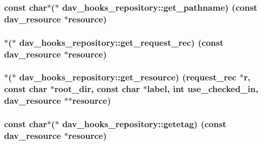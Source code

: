\subsubsection[{\texorpdfstring{get\+\_\+pathname}{get_pathname}}]{\setlength{\rightskip}{0pt plus 5cm}const char$\ast$($\ast$ dav\+\_\+hooks\+\_\+repository\+::get\+\_\+pathname) (const {\bf dav\+\_\+resource} $\ast${\bf resource})}\hypertarget{structdav__hooks__repository_a102c741e2fa513e2478f6f789c2dced4}{}\label{structdav__hooks__repository_a102c741e2fa513e2478f6f789c2dced4}
\subsubsection[{\texorpdfstring{get\+\_\+request\+\_\+rec}{get_request_rec}}]{$\ast$($\ast$ dav\+\_\+hooks\+\_\+repository\+::get\+\_\+request\+\_\+rec) (const {\bf dav\+\_\+resource} $\ast${\bf resource})}\hypertarget{structdav__hooks__repository_aa1286ed7e298ae4d72780bfc4538f7bd}{}\label{structdav__hooks__repository_aa1286ed7e298ae4d72780bfc4538f7bd}
\subsubsection[{\texorpdfstring{get\+\_\+resource}{get_resource}}]{$\ast$($\ast$ dav\+\_\+hooks\+\_\+repository\+::get\+\_\+resource) ({\bf request\+\_\+rec} $\ast${\bf r}, const char $\ast$root\+\_\+dir, const char $\ast${\bf label}, {\bf int} use\+\_\+checked\+\_\+in, {\bf dav\+\_\+resource} $\ast$$\ast${\bf resource})}\hypertarget{structdav__hooks__repository_ac2cd520aaf04f5dd518a9da60ba910c5}{}\label{structdav__hooks__repository_ac2cd520aaf04f5dd518a9da60ba910c5}
\subsubsection[{\texorpdfstring{getetag}{getetag}}]{\setlength{\rightskip}{0pt plus 5cm}const char$\ast$($\ast$ dav\+\_\+hooks\+\_\+repository\+::getetag) (const {\bf dav\+\_\+resource} $\ast${\bf resource})}\hypertarget{structdav__hooks__repository_a99fea90b6b349589210c278171d69862}{}\label{structdav__hooks__repository_a99fea90b6b349589210c278171d69862}
